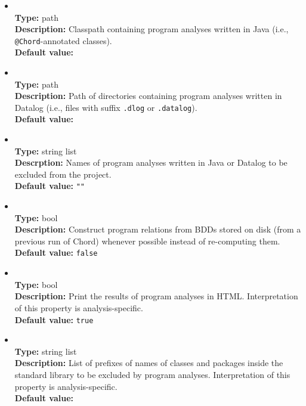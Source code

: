 \begin{itemize}
\item
{} \\
{\bf Type:} path \\
{\bf Description:} Classpath containing program analyses written in Java (i.e., {\tt @Chord}-annotated classes). \\
{\bf Default value:}  

\item
{} \\
{\bf Type:} path \\
{\bf Description:} Path of directories containing program analyses written in Datalog (i.e., files with suffix {\tt .dlog} or {\tt .datalog}). \\
{\bf Default value:}  

\item
{} \\
{\bf Type:} string list \\
{\bf Descrption:} Names of program analyses written in Java or Datalog to be excluded from the project. \\
{\bf Default value:} {\tt ""}

\item
{} \\
{\bf Type:} bool \\
{\bf Description:} Construct program relations from BDDs stored on disk (from a previous run of Chord) whenever possible instead of re-computing them. \\
{\bf Default value:} {\tt false} 

\item
{} \\
{\bf Type:} bool \\
{\bf Description:} Print the results of program analyses in HTML.  Interpretation of this property is analysis-specific. \\
{\bf Default value:} {\tt true} 

\item
{} \\
{\bf Type:} string list \\
{\bf Description:} List of prefixes of names of classes and packages inside the standard library to be excluded by program analyses.  Interpretation of this property is analysis-specific. \\
{\bf Default value:}  


\end{itemize}
